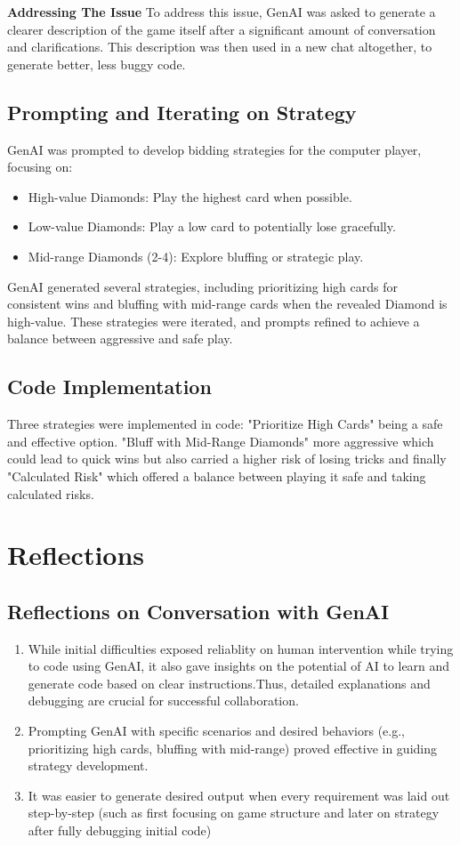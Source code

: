 \documentclass{article}
\begin{document}
\textbf{Addressing The Issue}
To address this issue, GenAI was asked to generate a clearer description of the game itself after a significant amount of conversation and clarifications. This description was then used in a new chat altogether, to generate better, less buggy code. 

\subsection{Prompting and Iterating on Strategy}
GenAI was prompted to develop bidding strategies for the computer player, focusing on:
\begin{itemize}
    \item High-value Diamonds: Play the highest card when possible.
    \item Low-value Diamonds: Play a low card to potentially lose gracefully.
    \item Mid-range Diamonds (2-4): Explore bluffing or strategic play.
\end{itemize}
GenAI generated several strategies, including prioritizing high cards for consistent wins and bluffing with mid-range cards when the revealed Diamond is high-value. These strategies were iterated, and prompts refined to achieve a balance between aggressive and safe play.


\subsection{Code Implementation}

Three strategies were implemented in code: "Prioritize High Cards" being a safe and effective option. "Bluff with Mid-Range Diamonds" more aggressive which could lead to quick wins but also carried a higher risk of losing tricks and finally "Calculated Risk" which offered a balance between playing it safe and taking calculated risks.

\section{Reflections}
\subsection{Reflections on Conversation with GenAI}
\begin{enumerate}
    \item While initial difficulties exposed reliablity on human intervention while trying to code using GenAI, it also gave insights on the potential of AI to learn and generate code based on clear instructions.Thus, detailed explanations and debugging are crucial for successful collaboration.
    \item Prompting GenAI with specific scenarios and desired behaviors (e.g., prioritizing high cards, bluffing with mid-range) proved effective in guiding strategy development.
    \item It was easier to generate desired output when every requirement was laid out step-by-step (such as first focusing on game structure and later on strategy after fully debugging initial code)
\end{enumerate}
\end{document}
